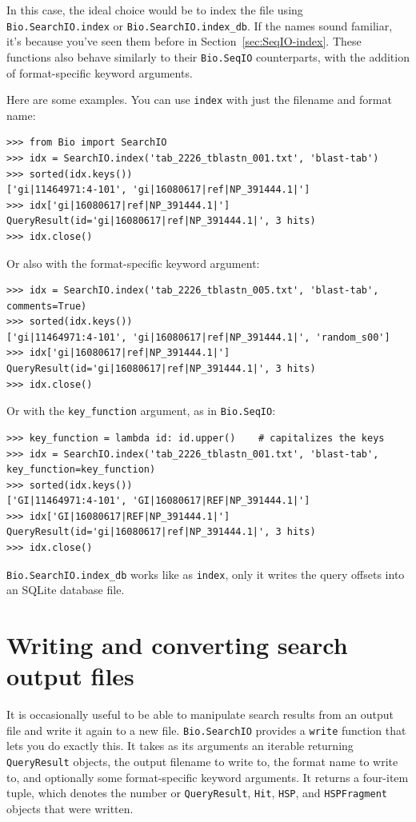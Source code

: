 \documentclass{report}
\begin{document}
In this case, the ideal choice would be to index the file using
\verb|Bio.SearchIO.index| or \verb|Bio.SearchIO.index_db|. If the names sound
familiar, it's because you've seen them before in  Section~\ref{sec:SeqIO-index}.
These functions also behave similarly to their \verb|Bio.SeqIO| counterparts,
with the addition of format-specific keyword arguments.

Here are some examples. You can use \verb|index| with just the filename and
format name:

\begin{verbatim}
>>> from Bio import SearchIO
>>> idx = SearchIO.index('tab_2226_tblastn_001.txt', 'blast-tab')
>>> sorted(idx.keys())
['gi|11464971:4-101', 'gi|16080617|ref|NP_391444.1|']
>>> idx['gi|16080617|ref|NP_391444.1|']
QueryResult(id='gi|16080617|ref|NP_391444.1|', 3 hits)
>>> idx.close()
\end{verbatim}

Or also with the format-specific keyword argument:

\begin{verbatim}
>>> idx = SearchIO.index('tab_2226_tblastn_005.txt', 'blast-tab', comments=True)
>>> sorted(idx.keys())
['gi|11464971:4-101', 'gi|16080617|ref|NP_391444.1|', 'random_s00']
>>> idx['gi|16080617|ref|NP_391444.1|']
QueryResult(id='gi|16080617|ref|NP_391444.1|', 3 hits)
>>> idx.close()
\end{verbatim}

Or with the \verb|key_function| argument, as in \verb|Bio.SeqIO|:

\begin{verbatim}
>>> key_function = lambda id: id.upper()    # capitalizes the keys
>>> idx = SearchIO.index('tab_2226_tblastn_001.txt', 'blast-tab', key_function=key_function)
>>> sorted(idx.keys())
['GI|11464971:4-101', 'GI|16080617|REF|NP_391444.1|']
>>> idx['GI|16080617|REF|NP_391444.1|']
QueryResult(id='gi|16080617|ref|NP_391444.1|', 3 hits)
>>> idx.close()
\end{verbatim}

\verb|Bio.SearchIO.index_db| works like as \verb|index|, only it writes the
query offsets into an SQLite database file.

\section{Writing and converting search output files}
\label{sec:searchio-write}

It is occasionally useful to be able to manipulate search results from an output
file and write it again to a new file. \verb|Bio.SearchIO| provides a
\verb|write| function that lets you do exactly this. It takes as its arguments
an iterable returning \verb|QueryResult| objects, the output filename to write
to, the format name to write to, and optionally some format-specific keyword
arguments. It returns a four-item tuple, which denotes the number or
\verb|QueryResult|, \verb|Hit|, \verb|HSP|, and \verb|HSPFragment| objects that
were written.
\end{document}
